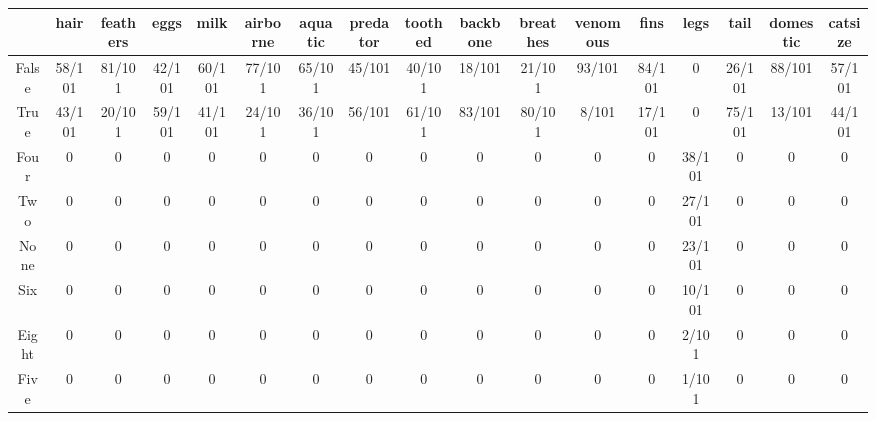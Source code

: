 \begin{tabular}{ccccccccccccccccc}
\toprule
{} &    hair & feathers &    eggs &    milk & airborne & aquatic & predator & toothed & backbone & breathes & venomous &    fins &    legs &    tail & domestic & catsize \\
\midrule
False &  58/101 &   81/101 &  42/101 &  60/101 &   77/101 &  65/101 &   45/101 &  40/101 &   18/101 &   21/101 &   93/101 &  84/101 &       0 &  26/101 &   88/101 &  57/101 \\
True  &  43/101 &   20/101 &  59/101 &  41/101 &   24/101 &  36/101 &   56/101 &  61/101 &   83/101 &   80/101 &    8/101 &  17/101 &       0 &  75/101 &   13/101 &  44/101 \\
Four  &       0 &        0 &       0 &       0 &        0 &       0 &        0 &       0 &        0 &        0 &        0 &       0 &  38/101 &       0 &        0 &       0 \\
Two   &       0 &        0 &       0 &       0 &        0 &       0 &        0 &       0 &        0 &        0 &        0 &       0 &  27/101 &       0 &        0 &       0 \\
None  &       0 &        0 &       0 &       0 &        0 &       0 &        0 &       0 &        0 &        0 &        0 &       0 &  23/101 &       0 &        0 &       0 \\
Six   &       0 &        0 &       0 &       0 &        0 &       0 &        0 &       0 &        0 &        0 &        0 &       0 &  10/101 &       0 &        0 &       0 \\
Eight &       0 &        0 &       0 &       0 &        0 &       0 &        0 &       0 &        0 &        0 &        0 &       0 &   2/101 &       0 &        0 &       0 \\
Five  &       0 &        0 &       0 &       0 &        0 &       0 &        0 &       0 &        0 &        0 &        0 &       0 &   1/101 &       0 &        0 &       0 \\
\bottomrule
\end{tabular}
